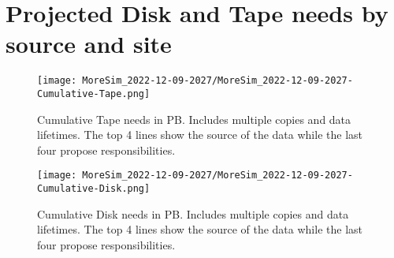 \section{Projected Disk and Tape needs by source and site}
\begin{figure}[h]
\centering\texttt{[image: MoreSim\_2022-12-09-2027/MoreSim\_2022-12-09-2027-Cumulative-Tape.png]}
\caption{Cumulative Tape needs in PB. Includes multiple copies and data lifetimes. The top 4 lines show the source of the data while the last four propose responsibilities.}
\label{fig:Cumulative-Tape}
\end{figure}
\begin{figure}[h]
\centering\texttt{[image: MoreSim\_2022-12-09-2027/MoreSim\_2022-12-09-2027-Cumulative-Disk.png]}
\caption{Cumulative Disk needs in PB. Includes multiple copies and data lifetimes. The top 4 lines show the source of the data while the last four propose responsibilities.}
\label{fig:Cumulative-Disk}
\end{figure}
